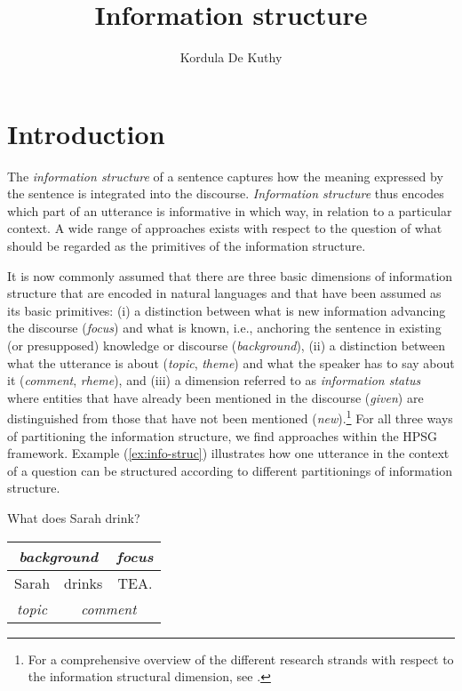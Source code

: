 \documentclass[output=paper,biblatex,babelshorthands,newtxmath,draftmode,colorlinks,citecolor=brown]{langscibook}
\author{Kordula {De Kuthy}\affiliation{Universität Tübingen}}
\title{Information structure}
\begin{document}
\maketitle
\label{chap-information-structure}



\section{Introduction} 

\largerpage
The \textit{information structure} of a sentence captures how the meaning
expressed by the sentence is integrated into the discourse.
\textit{Information structure} thus encodes which part of an
  utterance is informative in which way, in relation to a particular context.
A wide range of approaches exists with respect to the question of what
should be regarded as the primitives of the information structure.

It is now commonly assumed that there are three basic dimensions of
information structure that are encoded in natural languages and that
have been assumed as its basic primitives: (i) a distinction between
what is new information advancing the discourse (\emph{focus}) and
what is known, i.e., anchoring the sentence in existing (or
presupposed) knowledge or discourse (\emph{background}), (ii) a
distinction between what the utterance is about (\emph{topic},
\emph{theme}) and what the speaker has to say about it
(\emph{comment}, \emph{rheme}), and (iii) a dimension referred to as
\textit{information status} where entities that have already been
mentioned in the discourse (\textit{given}) are distinguished from
those that have not been mentioned (\emph{new}).\footnote{For a comprehensive overview of the different research strands with respect to the information structural dimension, see \citet{KruijffSteedman2003}.} For all three ways of
partitioning the information structure, we find approaches within the
HPSG framework.  Example (\ref{ex:info-struc}) illustrates how one
utterance in the context of a question can be structured according to
different partitionings of information structure.
\begin{exe}
\ex\label{ex:info-struc}
\begin{xlist}
  What does Sarah drink?
  \begin{tabular}[c]{|c|c|c|}
\multicolumn{2}{c|}{\small\textsl{background}} & \multicolumn{1}{c}{\small\textsl{focus}}\\\hline 
Sarah & drinks & TEA.\\\hline
\multicolumn{1}{c|}{\small\textsl{topic}} & \multicolumn{2}{c}{\small\textsl{comment}}\\
  \end{tabular}
\end{xlist}

\end{exe}
\end{document}
